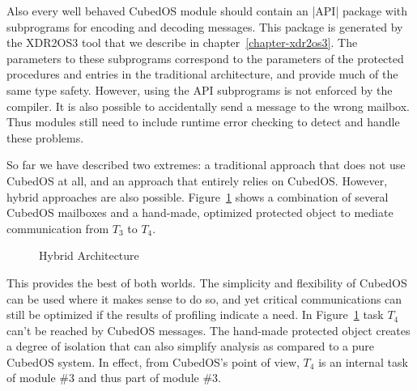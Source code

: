 Also every well behaved CubedOS module should contain an |API| package with subprograms for
encoding and decoding messages. This package is generated by the XDR2OS3 tool that we describe
in chapter~\ref{chapter-xdr2os3}. The parameters to these subprograms correspond to the
parameters of the protected procedures and entries in the traditional architecture, and provide
much of the same type safety. However, using the API subprograms is not enforced by the
compiler. It is also possible to accidentally send a message to the wrong mailbox. Thus modules
still need to include runtime error checking to detect and handle these problems.

So far we have described two extremes: a traditional approach that does not use CubedOS at all,
and an approach that entirely relies on CubedOS. However, hybrid approaches are also possible.
Figure~\ref{fig:hybrid-architecture} shows a combination of several CubedOS mailboxes and a
hand-made, optimized protected object to mediate communication from $T_3$ to $T_4$.

\begin{figure}[tbhp]
  \center
  \caption{Hybrid Architecture}
  \label{fig:hybrid-architecture}
\end{figure}

This provides the best of both worlds. The simplicity and flexibility of CubedOS can be used
where it makes sense to do so, and yet critical communications can still be optimized if the
results of profiling indicate a need. In Figure~\ref{fig:hybrid-architecture} task $T_4$ can't
be reached by CubedOS messages. The hand-made protected object creates a degree of isolation
that can also simplify analysis as compared to a pure CubedOS system. In effect, from CubedOS's
point of view, $T_4$ is an internal task of module \#3 and thus part of module \#3.

